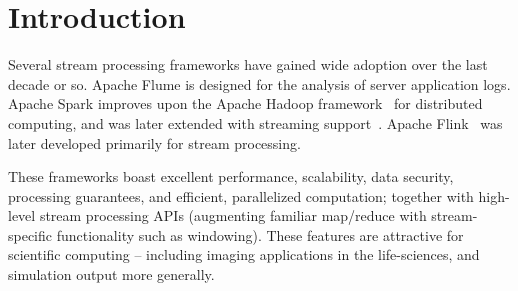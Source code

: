 \documentclass[letterpaper,conference]{IEEEtran}
\begin{document}
\section{Introduction}\label{intro}




Several stream processing frameworks have gained wide adoption over the last decade or so.
Apache Flume is designed for the analysis of server application logs. Apache Spark improves upon the Apache Hadoop framework~\cite{ApacheHadoop2011} for distributed computing, and was later extended with streaming support~\cite{zahariaApacheSparkUnified2016}. Apache Flink~\cite{carboneApacheFlinkStream2015} was later developed primarily for stream processing.


These frameworks boast 
excellent performance, scalability, data security, processing guarantees, and efficient, parallelized computation; together with high-level stream processing APIs (augmenting familiar map/reduce with stream-specific functionality such as windowing). These features are attractive for scientific computing -- including imaging applications in the life-sciences, and simulation output more generally.


\end{document}
